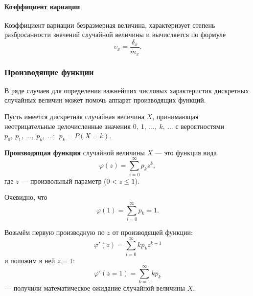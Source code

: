 \documentclass[a4paper]{article}
\newcommand{\sleq}{\leqslant}
\newcommand{\key}[1]{{\color{Medium}\bfseries #1}}
\begin{document}
                \paragraph{Коэффициент вариации}

                    Коэффициент вариации безразмерная величина, характеризует степень разбросанности значений случайной величины и вычисляется по формуле
                    \begin{equation*}
                        \upsilon_x = \frac{\delta_x}{m_x} .
                    \end{equation*}

            \subsubsection{Производящие функции}

                В ряде случаев для определения важнейших числовых характеристик дискретных случайных величин может помочь аппарат производящих функций.
                
                Пусть имеется дискретная случайная величина $X$, принимающая неотрицательные целочисленные значения $0 , \: 1 , \: \ldots , \: k , \: \ldots$ с вероятностями $p_0 , \: p_1 , \: \ldots , \: p_k , \: \ldots ; \:\: p_k = P(X = k)$.
                
                \key{Производящая функция} случайной величины $X$ --- это функция вида
                \begin{equation*}
                    \varphi (z) = \sum\limits_{i = 0}^{\infty} p_k z^k ,
                \end{equation*}
                где $z$ --- произвольный параметр ($0 < z \sleq 1$).

                Очевидно, что
                \begin{equation*}
                    \varphi (1) = \sum\limits_{i = 0}^{\infty} p_k = 1 .
                \end{equation*}

                Возьмём первую производную по $z$ от производящей функции:
                \begin{equation*}
                    \varphi ' (z) = \sum\limits_{i = 0}^{\infty} k p_k z^{k - 1}
                \end{equation*}
                и положим в ней $z = 1$:
                \begin{equation*}
                    \varphi ' (z = 1) = \sum\limits_{k = 1}^{\infty} k p_k
                \end{equation*}
                --- получили математическое ожидание случайной величины $X$.
\end{document}
